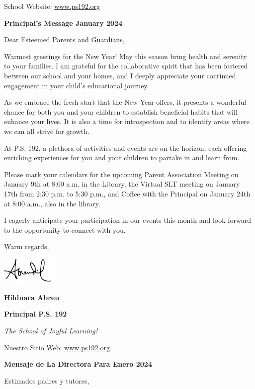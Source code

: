 \documentclass[12pt,letterpaper]{article}
\begin{document}
\vspace*{0.5in}
School Website: \href{https://www.ps192.org/apps/pages/index.jsp?uREC_ID=1504973&type=d&pREC_ID=2359028}{www.ps192.org}

\textbf{Principal's Message January 2024}

Dear Esteemed Parents and Guardians,

Warmest greetings for the New Year! May this season bring health and serenity to your families. I am grateful for the collaborative spirit that has been fostered between our school and your homes, and I deeply appreciate your continued engagement in your child's educational journey.

As we embrace the fresh start that the New Year offers, it presents a wonderful chance for both you and your children to establish beneficial habits that will enhance your lives. It is also a time for introspection and to identify areas where we can all strive for growth.

At P.S. 192, a plethora of activities and events are on the horizon, each offering enriching experiences for you and your children to partake in and learn from.

Please mark your calendars for the upcoming Parent Association Meeting on January 9th at 8:00 a.m. in the Library, the Virtual SLT meeting on January 17th from 2:30 p.m. to 5:30 p.m., and Coffee with the Principal on January 24th at 8:00 a.m., also in the library.

I eagerly anticipate your participation in our events this month and look forward to the opportunity to connect with you.

Warm regards,

\includegraphics[width=0.2\textwidth]{hil_signature}

\textbf{Hilduara Abreu}

\textbf{Principal P.S. 192}

\textit{The School of Joyful Learning!}

\newpage
\vspace*{.5in}
Nuestro Sitio Web: \href{https://www.ps192.org/apps/pages/index.jsp?uREC_ID=1504973&type=d&pREC_ID=2359028}{www.ps192.org}

\textbf{Mensaje de La Directora Para Enero 2024}

Estimados padres y tutores,
\end{document}
